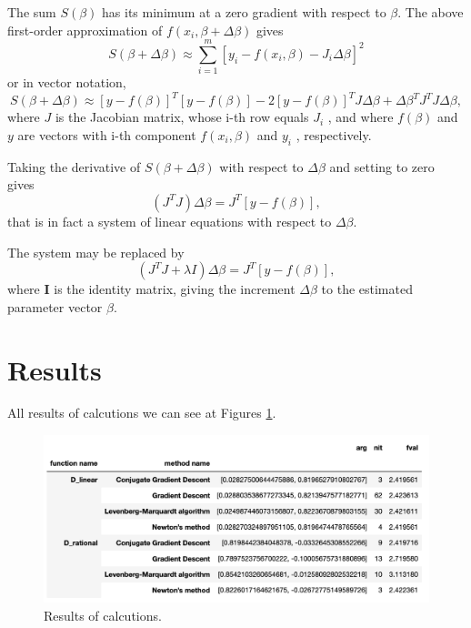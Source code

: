 \documentclass[a4paper,article,14pt]{extarticle}
\begin{document}
	The sum $S(\beta)$ has its minimum at a zero gradient with respect to $\beta$. The above first-order approximation of $f(x_i, \beta + \Delta \beta)$ gives $$S(\beta + \Delta \beta) \approx \sum_{i=1}^{m} [y_i - f(x_i, \beta) - J_i\Delta \beta]^2$$ or in vector notation, $$S(\beta+ \Delta \beta)\approx[y - f(\beta)]^T [y-f(\beta)]-2[y-f(\beta)]^T J\Delta \beta + \Delta \beta^T J^T J \Delta \beta,$$ where $J$ is the Jacobian matrix, whose i-th row equals $J_i$ , and where $f(\beta)$ and $y$ are vectors with i-th component $f(x_i, \beta)$ and $y_i$ , respectively.
	
	Taking the derivative of $S (\beta + \Delta \beta)$ with respect to $\Delta \beta$ and setting to zero gives $$(J^T J) \Delta \beta = J^T [y - f(\beta)],$$ that is in fact a system of linear equations with respect to $\Delta \beta$.
	
	The system may be replaced by $$(J^T J + \lambda I) \Delta \beta = J^T [y-f(\beta)],$$ where \textbf{I} is the identity matrix, giving the increment $\Delta \beta$ to the estimated parameter vector $\beta$.
	
	\section{Results}
	
	All results of calcutions we can see at Figures \ref{results}.
	\begin{figure}[h!]
		\centering
		\includegraphics[scale=0.6]{results.png}
		\caption{Results of calcutions.}
		\label{results}
	\end{figure}
	
\end{document}
